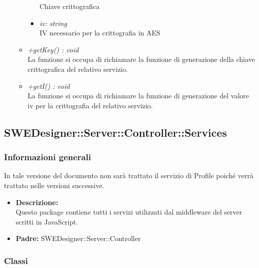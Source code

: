 \begin{itemize}
\begin{itemize}
\begin{itemize}
              Chiave crittografica
              \item \emph{iv: string}\\
              IV necessario per la crittografia in AES
            \end{itemize}
            \item \emph{+getKey() : void}\\
            La funzione si occupa di richiamare la funzione di generazione della chiave crittografica del relativo servizio.
            \item \emph{+getI() : void}\\
            La funzione si occupa di richiamare la funzione di generazione del valore iv per la crittografia del relativo servizio.
          \end{itemize}
        \end{itemize}
  \subsection{SWEDesigner::Server::Controller::Services}
    \subsubsection{Informazioni generali}
      In tale versione del documento non sarà trattato il servizio di Profile poiché verrà trattato nelle versioni successive.
      \begin{itemize}
        \item \textbf{Descrizione: }\\
        Questo package contiene tutti i servizi utilizzati dal middleware del server scritti in JavaScript.
        \item \textbf{Padre: }SWEDesigner::Server::Controller
      \end{itemize}
    \subsubsection{Classi}
